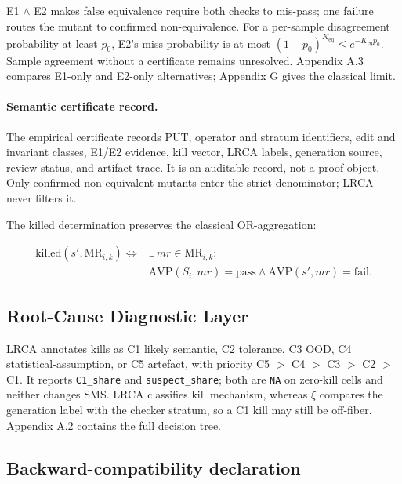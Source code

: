 \documentclass[review,12pt,authoryear]{elsarticle}
\begin{document}
E1 $\wedge$ E2 makes false equivalence require both checks to mis-pass;
one failure routes the mutant to confirmed non-equivalence. For a
per-sample disagreement probability at least \(p_0\), E2's miss
probability is at most
\((1-p_0)^{K_{\mathrm{eq}}}\leq e^{-K_{\mathrm{eq}}p_0}\).
Sample agreement without a certificate remains unresolved. Appendix A.3
compares E1-only and E2-only alternatives; Appendix G gives the
classical limit.

\paragraph{Semantic certificate record.}
The empirical certificate records PUT, operator and stratum identifiers,
edit and invariant classes, E1/E2 evidence, kill vector, LRCA labels,
generation source, review status, and artifact trace. It is an auditable
record, not a proof object. Only confirmed non-equivalent mutants enter
the strict denominator; LRCA never filters it.

The killed determination preserves the classical OR-aggregation:

\[
\begin{aligned}
\mathrm{killed}(s', \mathrm{MR}_{i,k}) \iff{} & \exists\,mr \in \mathrm{MR}_{i,k}: \\
& \mathrm{AVP}(S_i, mr) = \text{pass} \wedge
  \mathrm{AVP}(s', mr) = \text{fail}.
\end{aligned}
\]

\subsection{Root-Cause Diagnostic Layer}\label{lrca-engineering-attribution-layer-descriptive-not-in-sms}

LRCA annotates kills as C1 likely semantic, C2 tolerance, C3 OOD, C4
statistical-assumption, or C5 artefact, with priority
C5 \(>\) C4 \(>\) C3 \(>\) C2 \(>\) C1. It reports
\texttt{C1\_share} and \texttt{suspect\_share}; both are \texttt{NA} on
zero-kill cells and neither changes SMS. LRCA classifies kill mechanism,
whereas \(\xi\) compares the generation label with the checker stratum,
so a C1 kill may still be off-fiber. Appendix A.2 contains the full
decision tree.

\subsection{Backward-compatibility declaration}\label{backward-compatibility-declaration}
\end{document}
